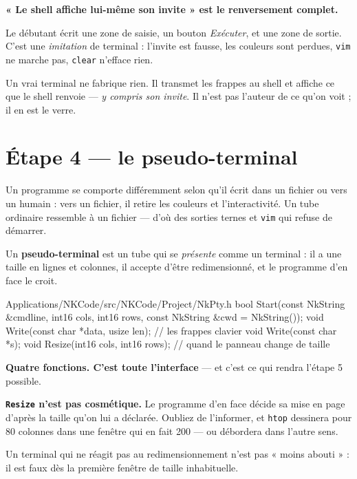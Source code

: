 \begin{nkretenir}
\textbf{« Le shell affiche lui-même son invite » est le renversement complet.}

Le débutant écrit une zone de saisie, un bouton \emph{Exécuter}, et une zone de
sortie. C'est une \emph{imitation} de terminal : l'invite est fausse, les
couleurs sont perdues, \texttt{vim} ne marche pas, \texttt{clear} n'efface rien.

Un vrai terminal ne fabrique rien. Il transmet les frappes au shell et affiche ce
que le shell renvoie --- \emph{y compris son invite}. Il n'est pas l'auteur de ce
qu'on voit ; il en est le verre.
\end{nkretenir}

\section{Étape 4 --- le pseudo-terminal}

Un programme se comporte différemment selon qu'il écrit dans un fichier ou vers
un humain : vers un fichier, il retire les couleurs et l'interactivité. Un tube
ordinaire ressemble à un fichier --- d'où des sorties ternes et \texttt{vim} qui
refuse de démarrer.

Un \textbf{pseudo-terminal} est un tube qui se \emph{présente} comme un
terminal : il a une taille en lignes et colonnes, il accepte d'être
redimensionné, et le programme d'en face le croit.

\begin{nkcode}{Applications/NKCode/src/NKCode/Project/NkPty.h}
bool Start(const NkString &cmdline, int16 cols, int16 rows,
           const NkString &cwd = NkString());
void Write(const char *data, usize len);   // les frappes clavier
void Write(const char *s);
void Resize(int16 cols, int16 rows);       // quand le panneau change de taille
\end{nkcode}

\begin{nkretenir}
\textbf{Quatre fonctions. C'est toute l'interface} --- et c'est ce qui rendra
l'étape 5 possible.
\end{nkretenir}

\begin{nkpiege}
\textbf{\texttt{Resize} n'est pas cosmétique.} Le programme d'en face décide sa
mise en page d'après la taille qu'on lui a déclarée. Oubliez de l'informer, et
\texttt{htop} dessinera pour 80 colonnes dans une fenêtre qui en fait 200 --- ou
débordera dans l'autre sens.

Un terminal qui ne réagit pas au redimensionnement n'est pas « moins abouti » :
il est faux dès la première fenêtre de taille inhabituelle.
\end{nkpiege}

